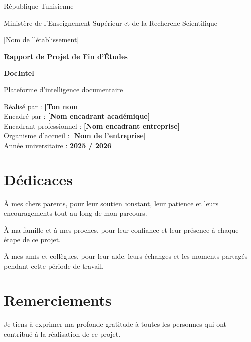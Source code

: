 \documentclass[12pt,a4paper]{report}
\begin{document}
\begin{titlepage}
  \centering
  \vspace*{1.5cm}

  {\Large R\'epublique Tunisienne\par}
  \vspace{0.3cm}
  {\Large Minist\`ere de l'Enseignement Sup\'erieur et de la Recherche Scientifique\par}
  \vspace{0.8cm}
  {\Large [Nom de l'établissement]\par}

  \vspace{2.2cm}
  {\Huge\bfseries Rapport de Projet de Fin d'Études\par}
  \vspace{0.8cm}
  {\LARGE\bfseries DocIntel\par}
  \vspace{0.4cm}
  {\Large Plateforme d'intelligence documentaire\par}

  \vspace{2.0cm}
  \begin{flushleft}
    R\'ealis\'e par : \textbf{[Ton nom]}\\[0.2cm]
    Encadr\'e par : \textbf{[Nom encadrant acad\'emique]}\\[0.2cm]
    Encadrant professionnel : \textbf{[Nom encadrant entreprise]}\\[0.2cm]
    Organisme d'accueil : \textbf{[Nom de l'entreprise]}\\[0.2cm]
    Ann\'ee universitaire : \textbf{2025 / 2026}
  \end{flushleft}

  \vfill
\end{titlepage}

\chapter*{D\'edicaces}
À mes chers parents, pour leur soutien constant, leur patience et leurs encouragements tout au long de mon parcours.

À ma famille et à mes proches, pour leur confiance et leur présence à chaque étape de ce projet.

À mes amis et collègues, pour leur aide, leurs échanges et les moments partagés pendant cette période de travail.

\chapter*{Remerciements}
Je tiens à exprimer ma profonde gratitude à toutes les personnes qui ont contribué à la réalisation de ce projet.
\end{document}
